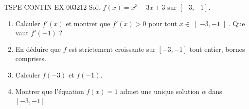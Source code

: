 \begin{exercice}{TSPE-CONTIN-EX-003}{2}{12}
Soit $f(x) = x^3 - 3x + 3$ sur $[-3, -1]$.
\begin{enumerate}
  \item Calculer $f'(x)$ et montrer que $f'(x) > 0$ pour tout $x \in \left]-3, -1\right[$. Que vaut $f'(-1)$ ?
  \item En déduire que $f$ est strictement croissante sur $[-3, -1]$ tout entier, bornes comprises.
  \item Calculer $f(-3)$ et $f(-1)$.
  \item Montrer que l'équation $f(x) = 1$ admet une unique solution $\alpha$ dans $[-3, -1]$.
\end{enumerate}
\end{exercice}
